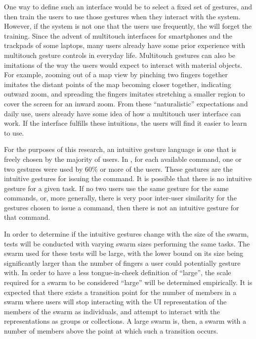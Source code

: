 \documentclass[]{article}
\begin{document}
One way to define such an interface would be to select a fixed set of gestures, and then train the users to use those gestures when they interact with the system. 
However, if the system is not one that the users use frequently, the will forget the training. 
Since the advent of multitouch interfaces for smartphones and the trackpads of some laptops, many users already have some prior experience with multitouch gesture controls in everyday life. 
Multitouch gestures can also be imitations of the way the users would expect to interact with material objects. 
For example, zooming out of a map view by pinching two fingers together imitates the distant points of the map becoming closer together, indicating outward zoom, and spreading the fingers imitates stretching a smaller region to cover the screen for an inward zoom. 
From these ``naturalistic'' expectations and daily use, users already have some idea of how a multitouch user interface can work. 
If the interface fulfills these intuitions, the users will find it easier to learn to use. 

For the purposes of this research, an intuitive gesture language is one that is freely chosen by the majority of users. 
In \cite{Micire:2009:ANG:1731903.1731912}, for each available command, one or two gestures were used by 60\% or more of the users. 
These gestures are the intuitive gestures for issuing the command. 
It is possible that there is no intuitive gesture for a given task.
If no two users use the same gesture for the same commands, or, more generally, there is very poor inter-user similarity for the gestures chosen to issue a command, then there is not an intuitive gesture for that command.

In order to determine if the intuitive gestures change with the size of the swarm, tests will be conducted with varying swarm sizes performing the same tasks. 
The swarm used for these tests will be large, with the lower bound on its size being significantly larger than the number of fingers a user could potentially gesture with. 
In order to have a less tongue-in-cheek definition of ``large'', the scale required for a swarm to be considered ``large'' will be determined empirically.
It is expected that there exists a transition point for the number of members in a swarm where users will stop interacting with the UI representation of the members of the swarm as individuals, and attempt to interact with the representations as groups or collections. 
A large swarm is, then, a swarm with a number of members above the point at which such a transition occurs. 
 
\end{document}
